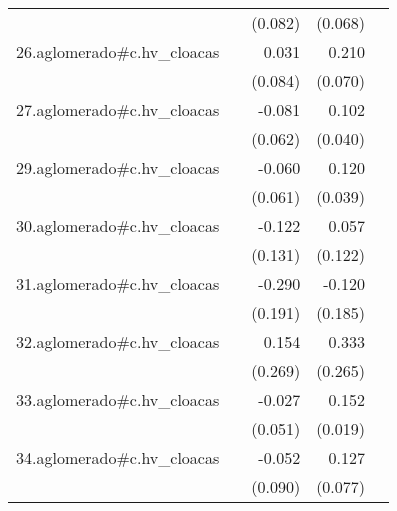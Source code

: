 {\begin{longtable}{l*{4}{D{.}{.}{-1}}}
            &                     &     (0.082)         &     (0.068)         &                     \\
\addlinespace
26.aglomerado#c.hv\_cloacas&                     &       0.031         &       0.210\sym{**} &                     \\
            &                     &     (0.084)         &     (0.070)         &                     \\
\addlinespace
27.aglomerado#c.hv\_cloacas&                     &      -0.081         &       0.102\sym{*}  &                     \\
            &                     &     (0.062)         &     (0.040)         &                     \\
\addlinespace
29.aglomerado#c.hv\_cloacas&                     &      -0.060         &       0.120\sym{**} &                     \\
            &                     &     (0.061)         &     (0.039)         &                     \\
\addlinespace
30.aglomerado#c.hv\_cloacas&                     &      -0.122         &       0.057         &                     \\
            &                     &     (0.131)         &     (0.122)         &                     \\
\addlinespace
31.aglomerado#c.hv\_cloacas&                     &      -0.290         &      -0.120         &                     \\
            &                     &     (0.191)         &     (0.185)         &                     \\
\addlinespace
32.aglomerado#c.hv\_cloacas&                     &       0.154         &       0.333         &                     \\
            &                     &     (0.269)         &     (0.265)         &                     \\
\addlinespace
33.aglomerado#c.hv\_cloacas&                     &      -0.027         &       0.152\sym{***}&                     \\
            &                     &     (0.051)         &     (0.019)         &                     \\
\addlinespace
34.aglomerado#c.hv\_cloacas&                     &      -0.052         &       0.127         &                     \\
            &                     &     (0.090)         &     (0.077)         &                     \\

\end{longtable}}
